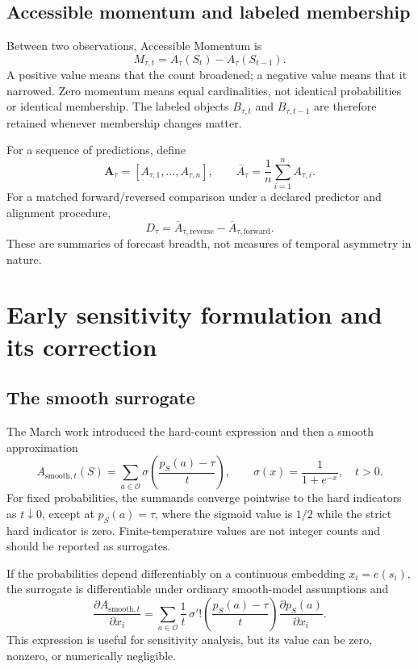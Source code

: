 \subsection{Accessible momentum and labeled membership}
Between two observations, Accessible Momentum is
\begin{equation}
M_{\tau,t}=A_\tau(S_t)-A_\tau(S_{t-1}).
\label{eq:momentum}
\end{equation}
A positive value means that the count broadened; a negative value means that it narrowed. Zero momentum means equal cardinalities, not identical probabilities or identical membership. The labeled objects $B_{\tau,t}$ and $B_{\tau,t-1}$ are therefore retained whenever membership changes matter.

For a sequence of predictions, define
\begin{equation}
\mathbf A_\tau=[A_{\tau,1},\ldots,A_{\tau,n}],\qquad
\overline A_\tau=\frac1n\sum_{i=1}^{n}A_{\tau,i}.
\label{eq:mean-volume}
\end{equation}
For a matched forward/reversed comparison under a declared predictor and alignment procedure,
\begin{equation}
D_\tau=\overline A_{\tau,\mathrm{reverse}}-\overline A_{\tau,\mathrm{forward}}.
\label{eq:direction-difference}
\end{equation}
These are summaries of forecast breadth, not measures of temporal asymmetry in nature.

\section{Early sensitivity formulation and its correction}
\subsection{The smooth surrogate}
The March work introduced the hard-count expression and then a smooth approximation
\begin{equation}
A_{\mathrm{smooth},t}(S)=
\sum_{a\in\mathcal O}\sigma\!\left(\frac{p_S(a)-\tau}{t}\right),
\qquad \sigma(x)=\frac{1}{1+e^{-x}},\quad t>0.
\label{eq:smooth-volume}
\end{equation}
For fixed probabilities, the summands converge pointwise to the hard indicators as $t\downarrow0$, except at $p_S(a)=\tau$, where the sigmoid value is $1/2$ while the strict hard indicator is zero. Finite-temperature values are not integer counts and should be reported as surrogates.

If the probabilities depend differentiably on a continuous embedding $x_i=e(s_i)$, the surrogate is differentiable under ordinary smooth-model assumptions and
\begin{equation}
\frac{\partial A_{\mathrm{smooth},t}}{\partial x_i}
=\sum_{a\in\mathcal O}\frac1t\,
\sigma'!\left(\frac{p_S(a)-\tau}{t}\right)
\frac{\partial p_S(a)}{\partial x_i}.
\label{eq:smooth-gradient}
\end{equation}
This expression is useful for sensitivity analysis, but its value can be zero, nonzero, or numerically negligible.

